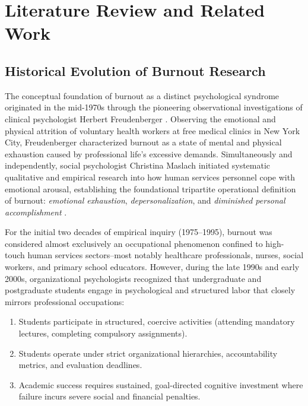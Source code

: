 \documentclass[12pt,a4paper,oneside]{report}
\begin{document}
\chapter{Literature Review and Related Work}
\label{ch:literature_review}

\section{Historical Evolution of Burnout Research}
\label{sec:burnout_history}
The conceptual foundation of burnout as a distinct psychological syndrome originated in the mid-1970s through the pioneering observational investigations of clinical psychologist Herbert Freudenberger \cite{freudenberger1974}. Observing the emotional and physical attrition of voluntary health workers at free medical clinics in New York City, Freudenberger characterized burnout as a state of mental and physical exhaustion caused by professional life's excessive demands. Simultaneously and independently, social psychologist Christina Maslach initiated systematic qualitative and empirical research into how human services personnel cope with emotional arousal, establishing the foundational tripartite operational definition of burnout: \emph{emotional exhaustion}, \emph{depersonalization}, and \emph{diminished personal accomplishment} \cite{maslach1981, maslach2001}.

For the initial two decades of empirical inquiry (1975--1995), burnout was considered almost exclusively an occupational phenomenon confined to high-touch human services sectors--most notably healthcare professionals, nurses, social workers, and primary school educators. However, during the late 1990s and early 2000s, organizational psychologists recognized that undergraduate and postgraduate students engage in psychological and structured labor that closely mirrors professional occupations:
\begin{enumerate}
    \item Students participate in structured, coercive activities (attending mandatory lectures, completing compulsory assignments).
    \item Students operate under strict organizational hierarchies, accountability metrics, and evaluation deadlines.
    \item Academic success requires sustained, goal-directed cognitive investment where failure incurs severe social and financial penalties.
\end{enumerate}
\end{document}
